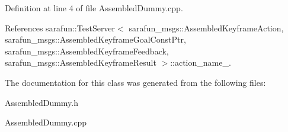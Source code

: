 Definition at line 4 of file Assembled\-Dummy.\-cpp.



References sarafun\-::\-Test\-Server$<$ sarafun\-\_\-msgs\-::\-Assembled\-Keyframe\-Action, sarafun\-\_\-msgs\-::\-Assembled\-Keyframe\-Goal\-Const\-Ptr, sarafun\-\_\-msgs\-::\-Assembled\-Keyframe\-Feedback, sarafun\-\_\-msgs\-::\-Assembled\-Keyframe\-Result $>$\-::action\-\_\-name\-\_\-.



The documentation for this class was generated from the following files\-:\begin{DoxyCompactItemize}
\item 
Assembled\-Dummy.\-h\item 
Assembled\-Dummy.\-cpp\end{DoxyCompactItemize}
